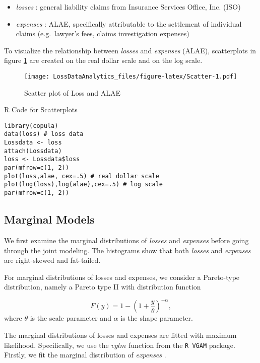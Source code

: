\documentclass[]{book}
\providecommand{\tightlist}{%
  \setlength{\itemsep}{0pt}\setlength{\parskip}{0pt}}
\theoremstyle{definition}
\theoremstyle{definition}
\theoremstyle{definition}
\theoremstyle{remark}
\begin{document}
\begin{itemize}
\tightlist
\item
  \emph{losses }: general liability claims from Insurance Services
  Office, Inc. (ISO)
\item
  \emph{expenses }: ALAE, specifically attributable to the settlement of
  individual claims (e.g.~lawyer's fees, claims investigation expenses)
\end{itemize}

To visualize the relationship between \emph{losses } and \emph{expenses
} (ALAE), scatterplots in figure \ref{fig:Scatter} are created on the
real dollar scale and on the log scale.

\begin{figure}
\centering
\texttt{[image: LossDataAnalytics\_files/figure-latex/Scatter-1.pdf]}
\caption{\label{fig:Scatter}Scatter plot of Loss and ALAE}
\end{figure}

R Code for Scatterplots

\hypertarget{display.ScaHis.2}{}
\begin{verbatim}
library(copula)
data(loss) # loss data
Lossdata <- loss 
attach(Lossdata) 
loss <- Lossdata$loss
par(mfrow=c(1, 2))
plot(loss,alae, cex=.5) # real dollar scale
plot(log(loss),log(alae),cex=.5) # log scale
par(mfrow=c(1, 2))
\end{verbatim}

\subsection{Marginal Models}\label{marginal-models}

We first examine the marginal distributions of \emph{losses } and
\emph{expenses } before going through the joint modeling. The histograms
show that both \emph{losses } and \emph{expenses } are right-skewed and
fat-tailed.

For marginal distributions of losses and expenses, we consider a
Pareto-type distribution, namely a Pareto type II with distribution
function

\[ F(y)=1- \left( 1 + \frac{y}{\theta} \right) ^{-\alpha},\] where
\(\theta\) is the scale parameter and \(\alpha\) is the shape parameter.

The marginal distributions of losses and expenses are fitted with
maximum likelihood. Specifically, we use the \(vglm\) function from the
\texttt{R\ VGAM} package. Firstly, we fit the marginal distribution of
\emph{expenses }.
\end{document}
